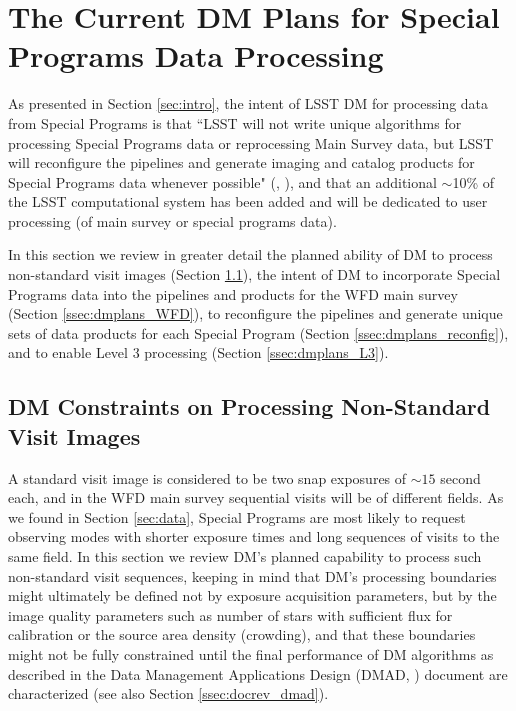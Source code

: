 \documentclass[DM,lsstdraft,toc]{lsstdoc}
\begin{document}
\clearpage
\section{The Current DM Plans for Special Programs Data Processing} \label{sec:dmplans}

As presented in Section \ref{sec:intro}, the intent of LSST DM for processing data from Special Programs is that ``LSST will not write unique algorithms for processing Special Programs data or reprocessing Main Survey data, but LSST will reconfigure the pipelines and generate imaging and catalog products for Special Programs data whenever possible" (\DPDD, ), and that an additional $\sim$10\% of the LSST computational system has been added and will be dedicated to user processing (of main survey or special programs data).

In this section we review in greater detail the planned ability of DM to process non-standard visit images (Section \ref{ssec:dmplans_NSV}), the intent of DM to incorporate Special Programs data into the pipelines and products for the WFD main survey (Section \ref{ssec:dmplans_WFD}), to reconfigure the pipelines and generate unique sets of data products for each Special Program (Section \ref{ssec:dmplans_reconfig}), and to enable Level 3 processing (Section \ref{ssec:dmplans_L3}).

\subsection{DM Constraints on Processing Non-Standard Visit Images}\label{ssec:dmplans_NSV}

A standard visit image is considered to be two snap exposures of $\sim15$ second each, and in the WFD main survey sequential visits will be of different fields. As we found in Section \ref{sec:data}, Special Programs are most likely to request observing modes with shorter exposure times and long sequences of visits to the same field. In this section we review DM's planned capability to process such non-standard visit sequences, keeping in mind that DM's processing boundaries might ultimately be defined not by exposure acquisition parameters, but by the image quality parameters such as number of stars with sufficient flux for calibration or the source area density (crowding), and that these boundaries might not be fully constrained until the final performance of DM algorithms as described in the Data Management Applications Design (DMAD, ) document are characterized (see also Section \ref{ssec:docrev_dmad}).
\end{document}
